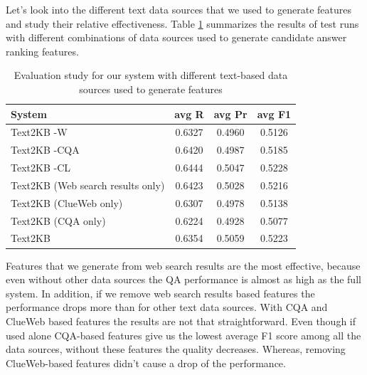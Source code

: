 Let's look into the different text data sources that we used to generate features and study their relative effectiveness.
Table \ref{table:ablation:features} summarizes the results of test runs with different combinations of data sources used to generate candidate answer ranking features.

\begin{table}
\caption{Evaluation study for our system with different text-based data sources used to generate features}
\label{table:ablation:features}
\begin{tabular}{| p{4cm} | c | c | c | }
\hline
System & avg R & avg Pr &  avg F1 \\
\hline
Text2KB -W & 0.6327 & 0.4960 & 0.5126 \\
Text2KB -CQA & 0.6420 & 0.4987 & 0.5185 \\
Text2KB -CL & 0.6444 & 0.5047 & 0.5228 \\
\hline
Text2KB (Web search results only) & 0.6423 & 0.5028 & 0.5216 \\
Text2KB (ClueWeb only) & 0.6307 & 0.4978 & 0.5138 \\
Text2KB (CQA only) & 0.6224 & 0.4928 & 0.5077 \\
\hline
Text2KB & 0.6354 & 0.5059 & 0.5223 \\
\hline
\end{tabular}
\end{table}

Features that we generate from web search results are the most effective, because even without other data sources the QA performance is almost as high as the full system.
In addition, if we remove web search results based features the performance drops more than for other text data sources.
With CQA and ClueWeb based features the results are not that straightforward.
Even though if used alone CQA-based features give us the lowest average F1 score among all the data sources, without these features the quality decreases.
Whereas, removing ClueWeb-based features didn't cause a drop of the performance.

